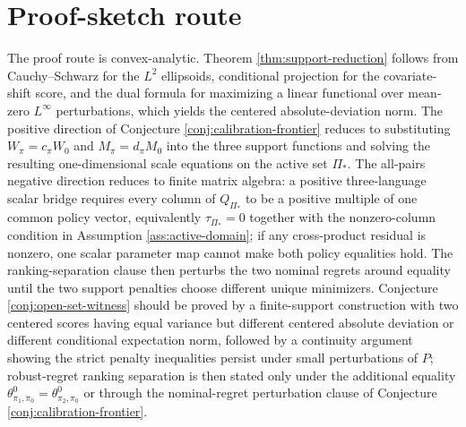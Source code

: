\documentclass[11pt]{article}
\theoremstyle{definition}
\theoremstyle{plain}
\theoremstyle{remark}
\begin{document}
\section{Proof-sketch route}
The proof route is convex-analytic.  Theorem \ref{thm:support-reduction} follows from Cauchy--Schwarz for the $L^2$ ellipsoids, conditional projection for the covariate-shift score, and the dual formula for maximizing a linear functional over mean-zero $L^\infty$ perturbations, which yields the centered absolute-deviation norm.  The positive direction of Conjecture \ref{conj:calibration-frontier} reduces to substituting $W_{\pi}=c_{\pi}W_0$ and $M_{\pi}=d_{\pi}M_0$ into the three support functions and solving the resulting one-dimensional scale equations on the active set $\Pi_\ast$.  The all-pairs negative direction reduces to finite matrix algebra: a positive three-language scalar bridge requires every column of $Q_{\Pi_\ast}$ to be a positive multiple of one common policy vector, equivalently $\tau_{\Pi_\ast}=0$ together with the nonzero-column condition in Assumption \ref{ass:active-domain}; if any cross-product residual is nonzero, one scalar parameter map cannot make both policy equalities hold.  The ranking-separation clause then perturbs the two nominal regrets around equality until the two support penalties choose different unique minimizers.  Conjecture \ref{conj:open-set-witness} should be proved by a finite-support construction with two centered scores having equal variance but different centered absolute deviation or different conditional expectation norm, followed by a continuity argument showing the strict penalty inequalities persist under small perturbations of $P$; robust-regret ranking separation is then stated only under the additional equality $\theta^0_{\pi_1,\pi_0}=\theta^0_{\pi_2,\pi_0}$ or through the nominal-regret perturbation clause of Conjecture \ref{conj:calibration-frontier}.
\end{document}
